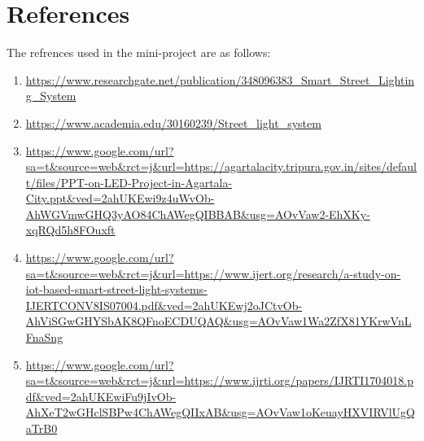 \documentclass{article}
\begin{document}
\section{\textbf{References}}
The refrences used in the mini-project are as follows:
\begin{enumerate}
    \item \url{https://www.researchgate.net/publication/348096383_Smart_Street_Lighting_System}
    \item \url{https://www.academia.edu/30160239/Street_light_system}
    \item \url{https://www.google.com/url?sa=t&source=web&rct=j&url=https://agartalacity.tripura.gov.in/sites/default/files/PPT-on-LED-Project-in-Agartala-City.ppt&ved=2ahUKEwi9z4uWvOb-AhWGVmwGHQ3yAO84ChAWegQIBBAB&usg=AOvVaw2-EhXKy-xqRQd5h8FOuxft}
    \item \url{https://www.google.com/url?sa=t&source=web&rct=j&url=https://www.ijert.org/research/a-study-on-iot-based-smart-street-light-systems-IJERTCONV8IS07004.pdf&ved=2ahUKEwj2oJCtvOb-AhViSGwGHYSbAK8QFnoECDUQAQ&usg=AOvVaw1Wa2ZfX81YKrwVnLFnaSng}
    \item \url{https://www.google.com/url?sa=t&source=web&rct=j&url=https://www.ijrti.org/papers/IJRTI1704018.pdf&ved=2ahUKEwiFu9jIvOb-AhXeT2wGHclSBPw4ChAWegQIIxAB&usg=AOvVaw1oKeuayHXVIRVlUgQaTrB0}
\end{enumerate}
\end{document}
